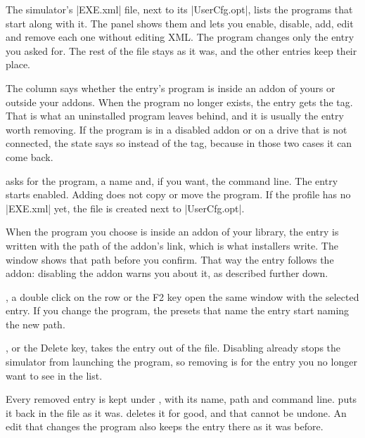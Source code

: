 \documentclass[11pt,a4paper]{article}
\begin{document}
The simulator's \where|EXE.xml| file, next to its \where|UserCfg.opt|, lists the
programs that start along with it. The  panel shows them and
lets you enable, disable, add, edit and remove each one without editing XML. The
program changes only the entry you asked for. The rest of the file stays as it
was, and the other entries keep their place.


The  column says whether the entry's program is inside an addon of
yours or outside your addons. When the program no longer exists, the entry gets
the  tag. That is what an uninstalled program leaves
behind, and it is usually the entry worth removing. If the program is in a
disabled addon or on a drive that is not connected, the state says so instead of
the tag, because in those two cases it can come back.

 asks for the program, a name and, if you want, the command line. The
entry starts enabled. Adding does not copy or move the program. If the profile
has no \where|EXE.xml| yet, the file is created next to \where|UserCfg.opt|.


When the program you choose is inside an addon of your library, the entry is
written with the path of the addon's link, which is what installers write. The
window shows that path before you confirm. That way the entry follows the addon:
disabling the addon warns you about it, as described further down.

, a double click on the row or the F2 key open the same window with the
selected entry. If you change the program, the presets that name the entry
start naming the new path.

, or the Delete key, takes the entry out of the file. Disabling
already stops the simulator from launching the program, so removing is for the
entry you no longer want to see in the list.

Every removed entry is kept under , with its name, path and command
line.  puts it back in the file as it was. 
deletes it for good, and that cannot be undone. An edit that changes the
program also keeps the entry there as it was before.
\end{document}
